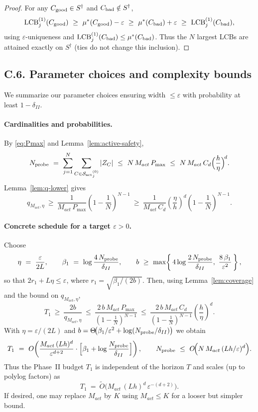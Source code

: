 \begin{proof}
For any $C_{\rm good}\in S^\dagger$ and $C_{\rm bad}\notin S^\dagger$,
\[
\operatorname{LCB}^{(1)}_j(C_{\rm good})\ \ge\ \mu^\ast(C_{\rm good})-\varepsilon\ \ge\ \mu^\ast(C_{\rm bad})+\varepsilon\ \ge\ \operatorname{LCB}^{(1)}_j(C_{\rm bad}),
\]
using $\varepsilon$-uniqueness and $\operatorname{LCB}^{(1)}_j(C_{\rm bad})\le \mu^\ast(C_{\rm bad})$.
Thus the $N$ largest LCBs are attained exactly on $S^\dagger$ (ties do not change this inclusion).
\end{proof}

\subsection*{C.6.\; Parameter choices and complexity bounds}

We summarize our parameter choices ensuring width $\le \varepsilon$ with probability at least $1-\delta_{II}$.

\paragraph{Cardinalities and probabilities.}
By \eqref{eq:Pmax} and Lemma~\ref{lem:active-safety},
\[
N_{\text{probe}}\ =\ \sum_{j=1}^N \sum_{C\in {\mathcal{S}_{\mathrm{act}}}^{(0)}_j} |Z_C|
\ \le\ N\,M_{act}\,P_{\max}
\ \le\ N\,M_{act}\,C_d\Bigl(\frac{h}{\eta}\Bigr)^{\!d}.
\]
Lemma~\ref{lem:q-lower} gives
\[
q_{M_{act},\eta}\ \ge\ \frac{1}{M_{act}\,P_{\max}}\left(1-\frac{1}{N}\right)^{N-1}
\ \ge\ \frac{1}{M_{act}\,C_d}\left(\frac{\eta}{h}\right)^{\!d}\left(1-\frac{1}{N}\right)^{N-1}.
\]

\paragraph{Concrete schedule for a target $\varepsilon>0$.}
Choose
\[
\eta\ =\ \frac{\varepsilon}{2L},\qquad
\beta_1\ =\ \log\frac{4\,\NumProbes}{\delta_{II}},\qquad
b\ \ge\ \max\!\left\{\, 4\log\frac{2\,\NumProbes}{\delta_{II}},\ \frac{8\,\beta_1}{\varepsilon^2}\,\right\},
\]
so that $2r_1+L\eta \le \varepsilon$, where $r_1=\sqrt{\beta_1/(2b)}$.
Then, using Lemma~\ref{lem:coverage} and the bound on $q_{M_{act},\eta}$,
\[
T_1 \ \ge\ \frac{2b}{q_{M_{act},\eta}}
\ \le\ \frac{2\,b\,M_{act}\,P_{\max}}{\left(1-\frac{1}{N}\right)^{N-1}}
\ \le\ \frac{2\,b\,M_{act}\,C_d}{\left(1-\frac{1}{N}\right)^{N-1}}
\left(\frac{h}{\eta}\right)^{\!d}.
\]
With $\eta=\varepsilon/(2L)$ and $b=\Theta\!\big(\beta_1/\varepsilon^2 + \log(N_{\text{probe}}/\delta_{II})\big)$ we obtain
\[
T_1 \ =\ O\!\left(
\frac{M_{act}\,(Lh)^d}{\varepsilon^{d+2}}\cdot
\Bigl[\beta_1 + \log\frac{N_{\text{probe}}}{\delta_{II}}\Bigr]
\right),
\qquad
N_{\text{probe}} \ \le\ O\!\Big(N\,M_{act}\,(Lh/\varepsilon)^d\Big).
\]
Thus the Phase~II budget $T_1$ is independent of the horizon $T$ and scales (up to polylog factors) as
\[
T_1 \ =\ \tilde O\!\Big(M_{act}\,(Lh)^d\,\varepsilon^{-(d+2)}\Big).
\]
If desired, one may replace $M_{act}$ by $K$ using $M_{act}\le K$ for a looser but simpler bound.
\medskip

